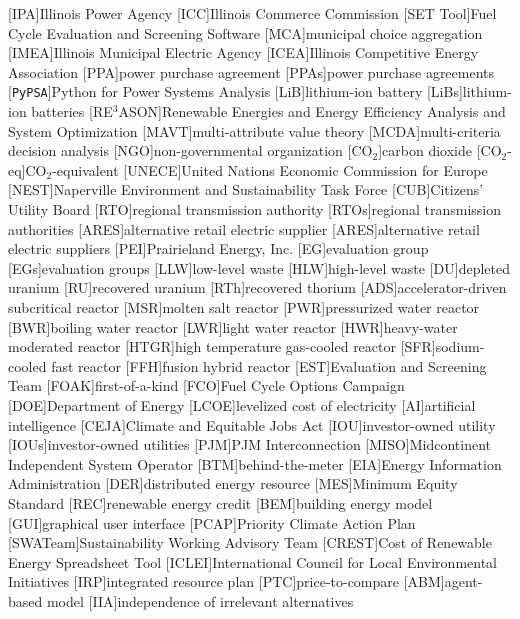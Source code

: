 [IPA]{Illinois Power Agency}
[ICC]{Illinois Commerce Commission}
[SET Tool]{Fuel Cycle Evaluation and Screening Software}
[MCA]{municipal choice aggregation}
[IMEA]{Illinois Municipal Electric Agency}
[ICEA]{Illinois Competitive Energy Association}
[PPA]{power purchase agreement}
[PPAs]{power purchase agreements}
[\texttt{PyPSA}]{Python for Power Systems Analysis}
[LiB]{lithium-ion battery}
[LiBs]{lithium-ion batteries}
[RE$^3$ASON]{Renewable Energies and Energy Efficiency Analysis and System Optimization}
[MAVT]{multi-attribute value theory}
[MCDA]{multi-criteria decision analysis}
[NGO]{non-governmental organization}
[CO$_2$]{carbon dioxide}
[CO$_2$-eq]{CO$_2$-equivalent}
[UNECE]{United Nations Economic Commission for Europe}
[NEST]{Naperville Environment and Sustainability Task Force}
[CUB]{Citizens' Utility Board}
[RTO]{regional transmission authority}
[RTOs]{regional transmission authorities}
[ARES]{alternative retail electric supplier}
[ARES]{alternative retail electric suppliers}
[PEI]{Prairieland Energy, Inc.}
[EG]{evaluation group}
[EGs]{evaluation groups}
[LLW]{low-level waste}
[HLW]{high-level waste}
[DU]{depleted uranium}
[RU]{recovered uranium}
[RTh]{recovered thorium}
[ADS]{accelerator-driven subcritical reactor}
[MSR]{molten salt reactor}
[PWR]{pressurized water reactor}
[BWR]{boiling water reactor}
[LWR]{light water reactor}
[HWR]{heavy-water moderated reactor}
[HTGR]{high temperature gas-cooled reactor}
[SFR]{sodium-cooled fast reactor}
[FFH]{fusion hybrid reactor}
[EST]{Evaluation and Screening Team}
[FOAK]{first-of-a-kind}
[FCO]{Fuel Cycle Options Campaign}
[DOE]{Department of Energy}
[LCOE]{levelized cost of electricity}
[AI]{artificial intelligence}
[CEJA]{Climate and Equitable Jobs Act}
[IOU]{investor-owned utility}
[IOUs]{investor-owned utilities}
[PJM]{PJM Interconnection}
[MISO]{Midcontinent Independent System Operator}
[BTM]{behind-the-meter}
[EIA]{Energy Information Administration}
[DER]{distributed energy resource}
[MES]{Minimum Equity Standard}
[REC]{renewable energy credit}
[BEM]{building energy model}
[GUI]{graphical user interface}
[PCAP]{Priority Climate Action Plan}
[SWATeam]{Sustainability Working Advisory Team}
[CREST]{Cost of Renewable Energy Spreadsheet Tool}
[ICLEI]{International Council for Local Environmental Initiatives}
[IRP]{integrated resource plan}
[PTC]{price-to-compare}
[ABM]{agent-based model}
[IIA]{independence of irrelevant alternatives}

